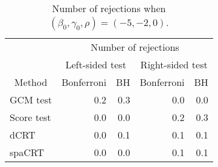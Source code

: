 \begin{table}[!h]
\centering
\caption{\label{tab:simulation_rejection_beta_-5_gamma_-2}Number of rejections when $(\beta_0,\gamma_0,\rho) = (-5, -2, 0)$.}
\centering
\begin{tabular}[t]{lrrrr}
\toprule
\multicolumn{1}{c}{ } & \multicolumn{4}{c}{Number of rejections} \\
\cmidrule(l{3pt}r{3pt}){2-5}
\multicolumn{1}{c}{ } & \multicolumn{2}{c}{Left-sided test} & \multicolumn{2}{c}{Right-sided test} \\
\cmidrule(l{3pt}r{3pt}){2-3} \cmidrule(l{3pt}r{3pt}){4-5}
\multicolumn{1}{c}{Method} & \multicolumn{1}{c}{Bonferroni} & \multicolumn{1}{c}{BH} & \multicolumn{1}{c}{Bonferroni} & \multicolumn{1}{c}{BH} \\
\cmidrule(l{3pt}r{3pt}){1-1} \cmidrule(l{3pt}r{3pt}){2-2} \cmidrule(l{3pt}r{3pt}){3-3} \cmidrule(l{3pt}r{3pt}){4-4} \cmidrule(l{3pt}r{3pt}){5-5}
GCM test & 0.2 & 0.3 & 0.0 & 0.0\\
Score test & 0.0 & 0.0 & 0.2 & 0.3\\
dCRT & 0.0 & 0.1 & 0.1 & 0.1\\
spaCRT & 0.0 & 0.0 & 0.1 & 0.1\\
\bottomrule
\end{tabular}
\end{table}
